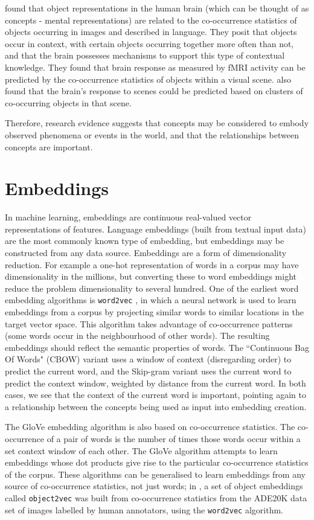 \cite{CoocurrenceVisionLanguage2021} found that object representations in the human brain (which can be thought of as concepts - mental representations) are related to the co-occurrence statistics of objects occurring in images and described in language. They posit that objects occur in context, with certain objects occurring together more often than not, and that the brain possesses mechanisms to support this type of contextual knowledge. They found that brain response as measured by fMRI activity can be predicted by the co-occurrence statistics of objects within a visual scene. \cite{STANSBURY20131025} also found that the brain's response to scenes could be predicted based on clusters of co-occurring objects in that scene. 

Therefore, research evidence suggests that concepts may be considered to embody observed phenomena or events in the world, and that the relationships between concepts are important. 

\section{Embeddings}

In machine learning, embeddings are continuous real-valued vector representations of features. Language embeddings (built from textual input data) are the most commonly known type of embedding, but embeddings may be constructed from any data source. Embeddings are a form of dimensionality reduction. For example a one-hot representation of words in a corpus may have dimensionality in the millions, but converting these to word embeddings might reduce the problem dimensionality to several hundred. One of the earliest word embedding algorithms is \texttt{word2vec} \cite{word2vec}, in which a neural network is used to learn embeddings from a corpus by projecting similar words to similar locations in the target vector space. This algorithm takes advantage of co-occurrence patterns (some words occur in the neighbourhood of other words). The resulting embeddings should reflect the semantic properties of words. The ``Continuous Bag Of Words" (CBOW) variant uses a window of context (disregarding order) to predict the current word, and the Skip-gram variant uses the current word to predict the context window, weighted by distance from the current word. In both cases, we see that the context of the current word is important, pointing again to a relationship between the concepts being used as input into embedding creation. 

The GloVe \cite{pennington2014glove} embedding algorithm is also based on co-occurrence statistics. The co-occurrence of a pair of words is the number of times those words occur within a set context window of each other. The GloVe algorithm attempts to learn embeddings whose dot products give rise to the particular co-occurrence statistics of the corpus. These algorithms can be generalised to learn embeddings from any source of co-occurrence statistics, not just words; in \cite{CoocurrenceVisionLanguage2021}, a set of object embeddings called \texttt{object2vec} was built from co-occurrence statistics from the ADE20K data set \cite{ADE20K} of images labelled by human annotators, using the \texttt{word2vec} algorithm. 


